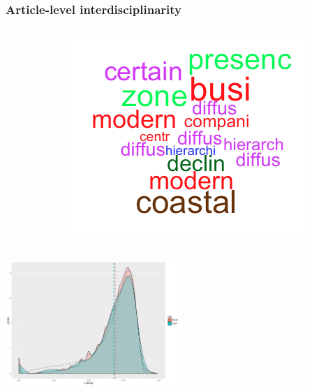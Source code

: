\begin{frame}
\frametitle{Article-level interdisciplinarity}



\begin{columns}
\begin{column}{0.5\textwidth}

\end{column}
\begin{column}{0.3\textwidth}
\includegraphics[width=\textwidth]{figures/exampleWordcloud_24872}
\end{column}
\end{columns}

\centering

\includegraphics[width=0.5\textwidth]{figures/firstorderint_withNull}

\end{frame}


